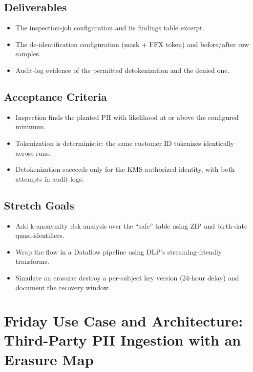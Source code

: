 \subsection*{Deliverables}
\begin{itemize}
    \item The inspection-job configuration and its findings table excerpt.
    \item The de-identification configuration (mask + FFX token) and before/after row samples.
    \item Audit-log evidence of the permitted detokenization and the denied one.
\end{itemize}

\subsection*{Acceptance Criteria}
\begin{itemize}
    \item Inspection finds the planted PII with likelihood at or above the configured minimum.
    \item Tokenization is deterministic: the same customer ID tokenizes identically across runs.
    \item Detokenization succeeds only for the KMS-authorized identity, with both attempts in audit logs.
\end{itemize}

\subsection*{Stretch Goals}
\begin{itemize}
    \item Add k-anonymity risk analysis over the ``safe'' table using ZIP and birth-date quasi-identifiers.
    \item Wrap the flow in a Dataflow pipeline using DLP's streaming-friendly transforms.
    \item Simulate an erasure: destroy a per-subject key version (24-hour delay) and document the recovery window.
\end{itemize}

\section{Friday Use Case and Architecture: Third-Party PII Ingestion with an Erasure Map}

